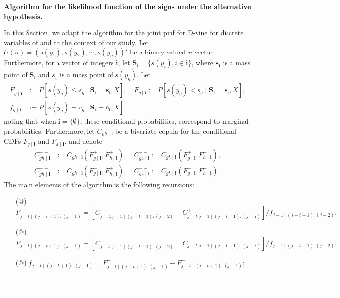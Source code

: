 \documentclass[harvard,11pt]{article}
\makeatletter
\newcommand*{\rom}[1]{\expandafter\@slowromancap\romannumeral #1@}
\newenvironment{proof}[1][Proof]{\textbf{#1.} }{\  \rule{0.5em}{0.5em}}
\makeatother
\begin{document}
\begin{proof}[Algorithm for the likelihood function of the signs under the alternative hypothesis]

In this Section, we adapt the algorithm for the joint pmf for D-vine for discrete variables of \citet{panagiotelis2012pair} and \citet{joe2014dependence} to the context of our study. Let $U(n)=\left(s(y_1),s(y_2),\cdots,s(y_n)\right)'$ be a binary valued $n$-vector. Furthermore, for a vector of integers $\mathbf{i}$, let $\mathbf{S_{i}}=\{s(y_i), i\in \mathbf{i}\}$, where $\mathbf{s_i}$ is a mass point of $\mathbf{S_i}$ and $s_g$ is a mass point of $s(y_g)$. Let
\begingroup
\allowdisplaybreaks
\begin{align*}
F_{g\mid \mathbf{i}}^{+}&:=P\left[s(y_g)\leq s_g\mid \mathbf{S_i}=\mathbf{s_i},X\right],\quad F_{g\mid \mathbf{i}}^{-}:=P\left[s(y_g)< s_g\mid \mathbf{S_i}=\mathbf{s_i},X\right],\\
f_{g\mid \mathbf{i}}&:=P[s(y_g)=s_g\mid\mathbf{S_i}=\mathbf{s_i},X].
\end{align*}
 \endgroup 
noting that when $\mathbf{i}=\{\emptyset\}$, these conditional probabilities, correspond to marginal probabilities. Furthermore, let  $C_{gh\mid\mathbf{i}}$ be a bivariate copula for the conditional CDFs $F_{g\mid\mathbf{i}}$ and $F_{h\mid\mathbf{i}}$, and denote
\begingroup
\allowdisplaybreaks
\begin{align*}
C^{++}_{gh\mid\mathbf{i}}&:=C_{gh\mid\mathbf{i}}\left(F_{g\mid\mathbf{i}}^+,F_{h\mid\mathbf{i}}^+\right),\quad C^{+-}_{gh\mid\mathbf{i}}:=C_{gh\mid\mathbf{i}}\left(F_{g\mid\mathbf{i}}^+,F_{h\mid\mathbf{i}}^-\right),\\
C^{-+}_{gh\mid\mathbf{i}}&:=C_{gh\mid\mathbf{i}}\left(F_{g\mid\mathbf{i}}^-,F_{h\mid\mathbf{i}}^+\right),\quad C^{--}_{gh\mid\mathbf{i}}:=C_{gh\mid\mathbf{i}}\left(F_{g\mid\mathbf{i}}^-,F_{h\mid\mathbf{i}}^-\right).
\end{align*}
\endgroup
The main elements of the algorithm is the following recursions:
\begin{itemize}
\item[(\rom{1})] $F_{j-t\mid (j-t+1):(j-1)}^+=\left[C_{j-t,j-1\mid(j-t+1):(j-2)}^{++}-C_{j-t,j-1\mid(j-t+1):(j-2)}^{+-}\right]/f_{j-1\mid(j-t+1):(j-2)};$ 
\item[(\rom{2})] $F_{j-t\mid (j-t+1):(j-1)}^-=\left[C_{j-t,j-1\mid(j-t+1):(j-2)}^{-+}-C_{j-t,j-1\mid(j-t+1):(j-2)}^{--}\right]/f_{j-1\mid(j-t+1):(j-2)};$
\item[(\rom{3})] $f_{j-t\mid (j-t+1):(j-1)}=F_{j-t\mid (j-t+1):(j-1)}^+-F_{j-t\mid (j-t+1):(j-1)}^-;$

\end{itemize}
\end{proof}
\end{document}
